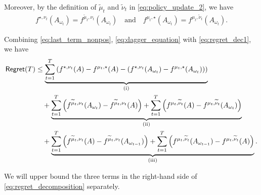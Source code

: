 Moreover, by the definition of $\widetilde{\mu}_t$ and $\widetilde{\nu}_t$ in \eqref{eq:policy_update_2}, we have
\begin{align}\label{eq:dagger_equation}
    f^{\star,\nu_t}(A_{\omega_t})=f^{\widetilde{\mu}_t,\nu_t}(A_{\omega_t})\quad\text{and}\quad f^{\mu_t,\star}(A_{\omega_t})=f^{\mu_t,\widetilde{\nu}_t}(A_{\omega_t}).
\end{align}

Combining \eqref{eq:last_term_nonpos}, \eqref{eq:dagger_equation} with \eqref{eq:regret_dec1}, we have
\begin{align}\label{eq:regret_decomposition}
    \mathsf{Regret}(T) &\leq \underbrace{\sum_{t=1}^T \left( f^{\star,\nu_t}(A) - f^{\mu_t,\star}(A) - \left(f^{\star,\nu_t}(A_{\omega_t}) - f^{\mu_t,\star}(A_{\omega_t}) \right)\right) }_{\text{(i)}}\notag\\
    &\quad + \underbrace{\sum_{t=1}^T \left(f^{\widetilde{\mu}_t,\nu_t}(A_{\omega_t})-f^{\widetilde{\mu}_t,\nu_t}(A)\right) + \sum_{t=1}^T \left(f^{\mu_t,\widetilde{\nu}_t}(A)-f^{\mu_t,\widetilde{\nu}_t}(A_{\omega_t})\right)}_{\text{(ii)}}\notag\\
    &\quad + \underbrace{\sum_{t=1}^T \left(f^{\widetilde{\mu}_t,\nu_t}(A)-f^{\widetilde{\mu}_t,\nu_t}(A_{\omega_{t-1}})\right) + \sum_{t=1}^T \left(f^{\mu_t,\widetilde{\nu}_t}(A_{\omega_{t-1}})-f^{\mu_t,\widetilde{\nu}_t}(A)\right)}_{\text{(iii)}}.
\end{align}

We will upper bound the three terms in the right-hand side of \eqref{eq:regret_decomposition} separately.


